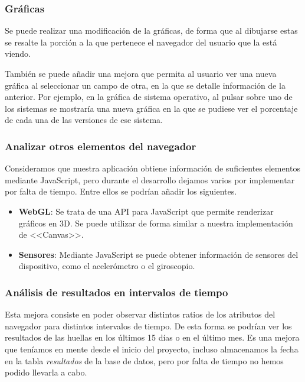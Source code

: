 \subsubsection{Gráficas}
Se puede realizar una modificación de la gráficas, de forma que al dibujarse estas se resalte la porción a la que pertenece el navegador del usuario que la está viendo.\par 
También se puede añadir una mejora que permita al usuario ver una nueva gráfica al seleccionar un campo de otra, en la que se detalle información de la anterior. Por ejemplo, en la gráfica de sistema operativo, al pulsar sobre uno de los sistemas se mostraría una nueva gráfica en la que se pudiese ver el porcentaje de cada una de las versiones de ese sistema.
\subsubsection{Analizar otros elementos del navegador}
Consideramos que nuestra aplicación obtiene información de suficientes elementos mediante JavaScript, pero durante el desarrollo dejamos varios por implementar por falta de tiempo. Entre ellos se podrían añadir los siguientes.
\begin{itemize}
    \item \textbf{WebGL}: Se trata de una API para JavaScript que permite renderizar gráficos en 3D. Se puede utilizar de forma similar a nuestra implementación de <<Canvas>>.
    \item \textbf{Sensores}: Mediante JavaScript se puede obtener información de sensores del dispositivo, como el acelerómetro o el giroscopio.
\end{itemize}
\subsubsection{Análisis de resultados en intervalos de tiempo}
Esta mejora consiste en poder observar distintos ratios de los atributos del navegador para distintos intervalos de tiempo. De esta forma se podrían ver los resultados de las huellas en los últimos 15 días o en el último mes. Es una mejora que teníamos en mente desde el inicio del proyecto, incluso almacenamos la fecha en la tabla \textit{resultados} de la base de datos, pero por falta de tiempo no hemos podido llevarla a cabo.